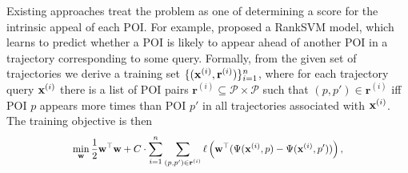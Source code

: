 Existing approaches treat the problem as one of determining a score for the intrinsic appeal of each POI.
For example, \citep{cikm16paper} proposed a RankSVM model,
which %
learns to predict whether a POI is likely to appear ahead of another POI in a trajectory corresponding to some query.
Formally,
from the given set of trajectories
we derive a training set
$\{ ( \mathbf{x}^{(i)}, \mathbf{r}^{(i)} ) \}_{i = 1}^n$,
where for each trajectory query $\mathbf{x}^{(i)}$ there is a list of POI pairs
$\mathbf{r}^{(i)} \subseteq \mathcal{P} \times \mathcal{P}$
such that
$(p, p') \in \mathbf{r}^{(i)}$
iff
POI $p$ appears more times than POI $p'$ in all trajectories associated with $\mathbf{x}^{(i)}$. %
The training objective is then
\begin{equation*}
\resizebox{0.7\linewidth}{!}{$\displaystyle
\displaystyle \min_{\w} \frac{1}{2} \w^\top \w + C \cdot \sum_{i = 1}^n \sum_{(p, p') \in \mathbf{r}^{(i)}} 
\ell\left( \w^\top ( \Psi( \x^{(i)}, p ) - \Psi( \x^{(i)}, p' ) ) \right),
$}
\end{equation*}
